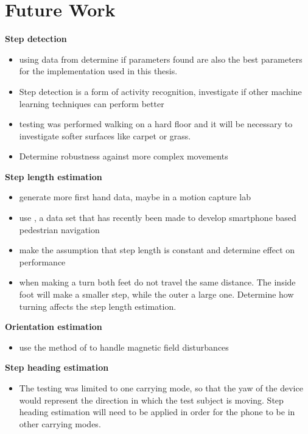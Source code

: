 \section{Future Work}

{\color{purple}
\textbf{Step detection}
\begin{itemize}
	\item using data from \cite{Salvi2018} determine if parameters found are also the best parameters for the implementation used in this thesis.
	\item Step detection is a form of activity recognition, investigate if other machine learning techniques can perform better  
	\item testing was performed walking on a hard floor and it will be necessary to investigate softer surfaces like carpet or grass.
	\item Determine robustness against more complex movements
\end{itemize}

\textbf{Step length estimation}
\begin{itemize}
	\item generate more first hand data, maybe in a motion capture lab  
	\item use \cite{Bayev2019}, a data set that has recently been made to develop smartphone based pedestrian navigation 
	\item make the assumption that step length is constant and determine effect on performance
	\item when making a turn both feet do not travel the same distance. The inside foot will make a smaller step, while the outer a large one. Determine how turning affects the step length estimation.
\end{itemize}

\textbf{Orientation estimation}
\begin{itemize}
	\item use the method of \cite{Michel2018} to handle magnetic field disturbances
\end{itemize}

\textbf{Step heading estimation}
\begin{itemize}
	\item The testing was limited to one carrying mode, so that the yaw of the device would represent the direction in which the test subject is moving. Step heading estimation will need to be applied in order for the phone to be in other carrying modes.
\end{itemize}

}

